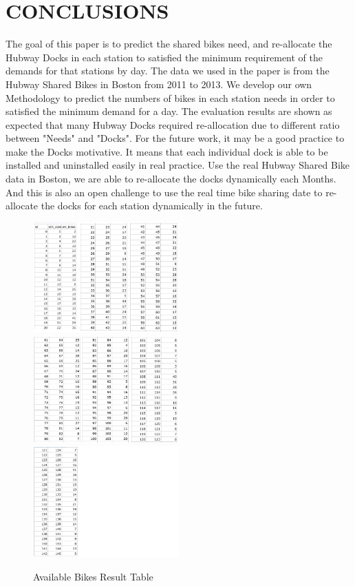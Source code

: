 \documentclass[journal, letterpaper]{IEEEtran}
\begin{document}
\section{CONCLUSIONS}
\large
The goal of this paper is to predict the shared bikes need, and re-allocate the Hubway Docks in each station to satisfied the minimum requirement of the demands for that stations by day. The data we used in the paper is from the Hubway Shared Bikes in Boston from 2011 to 2013.  We develop our own Methodology to predict the numbers of bikes in each station needs in order to satisfied the minimum demand for a day. The evaluation results are shown as expected that many Hubway Docks required re-allocation due to different ratio between "Needs" and "Docks". For the future work, it may be a good practice to make the Docks motivative. It means that each individual dock is able to be installed and uninstalled easily in real practice. Use the real Hubway Shared Bike data in Boston, we are able to re-allocate the docks dynamically each Months. And this is also an open challenge to use the real time bike sharing date to re-allocate the docks for each station dynamically in the future. 

\begin{figure}
  \includegraphics[width=0.5\textwidth]{all1.png}
  \includegraphics[width=0.5\textwidth]{all2.png}
  \includegraphics[width=0.5\textwidth]{all3.png}
  \caption{Available Bikes Result Table}
  \label{fig:2}
\end{figure}
\end{document}
